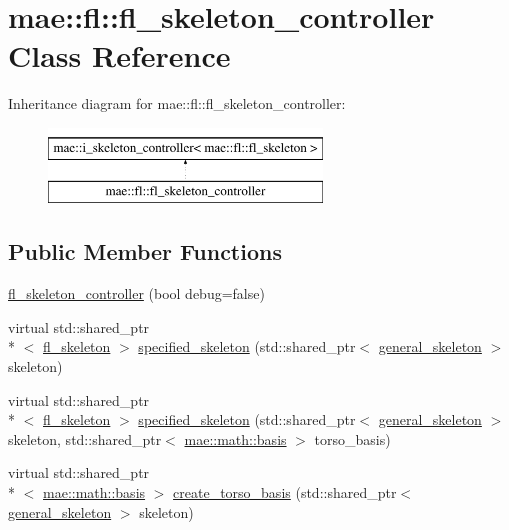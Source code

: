 \hypertarget{classmae_1_1fl_1_1fl__skeleton__controller}{\section{mae\-:\-:fl\-:\-:fl\-\_\-skeleton\-\_\-controller Class Reference}
\label{classmae_1_1fl_1_1fl__skeleton__controller}
}
Inheritance diagram for mae\-:\-:fl\-:\-:fl\-\_\-skeleton\-\_\-controller\-:\begin{figure}[H]
\begin{center}
\leavevmode
\includegraphics[height=2.000000cm]{classmae_1_1fl_1_1fl__skeleton__controller}
\end{center}
\end{figure}
\subsection*{Public Member Functions}
\begin{DoxyCompactItemize}
\item 
\hyperlink{classmae_1_1fl_1_1fl__skeleton__controller_a217858c5469e4d278d7b50b36750edd9}{fl\-\_\-skeleton\-\_\-controller} (bool debug=false)
\item 
virtual std\-::shared\-\_\-ptr\\*
$<$ \hyperlink{classmae_1_1fl_1_1fl__skeleton}{fl\-\_\-skeleton} $>$ \hyperlink{classmae_1_1fl_1_1fl__skeleton__controller_a0775153d13e802f14d2df3b5bcb51ff1}{specified\-\_\-skeleton} (std\-::shared\-\_\-ptr$<$ \hyperlink{classmae_1_1general__skeleton}{general\-\_\-skeleton} $>$ skeleton)
\item 
virtual std\-::shared\-\_\-ptr\\*
$<$ \hyperlink{classmae_1_1fl_1_1fl__skeleton}{fl\-\_\-skeleton} $>$ \hyperlink{classmae_1_1fl_1_1fl__skeleton__controller_a56a49213e8c75d8a659148965413a5a6}{specified\-\_\-skeleton} (std\-::shared\-\_\-ptr$<$ \hyperlink{classmae_1_1general__skeleton}{general\-\_\-skeleton} $>$ skeleton, std\-::shared\-\_\-ptr$<$ \hyperlink{classmae_1_1math_1_1basis}{mae\-::math\-::basis} $>$ torso\-\_\-basis)
\item 
virtual std\-::shared\-\_\-ptr\\*
$<$ \hyperlink{classmae_1_1math_1_1basis}{mae\-::math\-::basis} $>$ \hyperlink{classmae_1_1fl_1_1fl__skeleton__controller_a54cfb81a3be142676d73654b271b46c2}{create\-\_\-torso\-\_\-basis} (std\-::shared\-\_\-ptr$<$ \hyperlink{classmae_1_1general__skeleton}{general\-\_\-skeleton} $>$ skeleton)
\end{DoxyCompactItemize}



